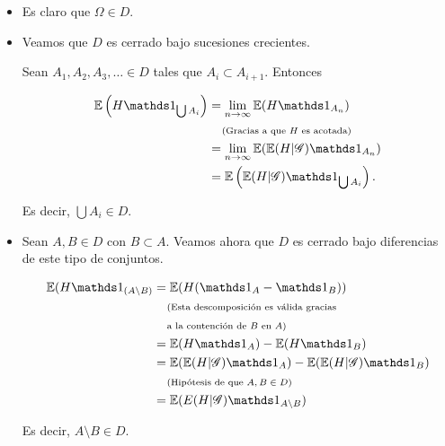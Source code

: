 \begin{itemize}
	\item 
        Es claro que $\Omega \in D$.\pn

    \item
        Veamos que $D$ es cerrado bajo sucesiones crecientes.\pn

        Sean $A_1, A_2, A_3, \dots \in D$ tales que $A_i \subset A_{i+1}$. Entonces

        \begin{align}
         \E\paren{H \indic_{\bigcup A_i}}   &=  \lim_{n \rightarrow \infty}    \E(H \indic_{A_n})             \\
                                            &\comment{Gracias a que $H$ es acotada}                           \\
                                            &=  \lim_{n \rightarrow \infty}    \E(\E( H | \G) \indic_{A_n})   \\
                                            &=  \E\paren{\E( H | \G) \indic_{\bigcup A_i}}.
        \end{align}

        Es decir, $\bigcup A_i \in D$.\pn

    \item
        Sean $A, B \in D$ con $B \subset A$. Veamos ahora que $D$ es cerrado bajo diferencias de este tipo de conjuntos. 

        \begin{align}
                \E(H \indic_{(A \setminus B)}   &=  \E(H (\indic_A - \indic_B))                                                 \\
                                                &\lcomment{Esta descomposición es válida gracias}                               \\
                                                &\rcomment{a la contención de $B$ en $A$}                                      \\
                                                &=  \E(H \indic_A) - \E(H \indic_B)                                             \\
                                                &=  \E(\E(H | \G) \indic_A) - \E(\E(H | \G) \indic_B)                           \\
                                                &\comment{Hipótesis de que $A, B \in D$}                                        \\
                                                &=  \E(E(H | \G) \indic_{A \setminus B})
        \end{align}

        Es decir, $A \setminus B \in D$.\pn
\end{itemize}


